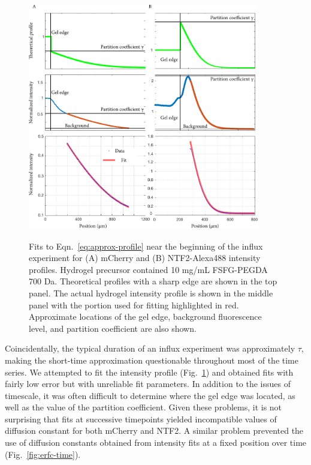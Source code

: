 \begin{figure}[t!]
\caption[Fits to concentration profiles at a fixed time.]{Fits to Eqn.~\ref{eq:approx-profile} near the beginning of the influx experiment for (A) mCherry and (B) NTF2-Alexa488 intensity profiles.  Hydrogel precursor contained 10 mg/mL FSFG-PEGDA 700 Da.  Theoretical profiles with a sharp edge are shown in the top panel.  The actual hydrogel intensity profile is shown in the middle panel with the portion used for fitting highlighted in red.  Approximate locations of the gel edge, background fluorescence level, and partition coefficient are also shown.}
\centering
\includegraphics[width=0.9\textwidth]{figs/ch04/mCherry-erfc-position.pdf}
\label{fig:erfc-position}
\end{figure} 

Coincidentally, the typical duration of an influx experiment was approximately $\tau$, making the short-time approximation questionable throughout most of the time series.  We attempted to fit the intensity profile (Fig.~\ref{fig:erfc-position}) and obtained fits with fairly low error but with unreliable fit parameters.  In addition to the issues of timescale, it was often difficult to determine where the gel edge was located, as well as the value of the partition coefficient.  Given these problems, it is not surprising that fits at successive timepoints yielded incompatible values of diffusion constant for both mCherry and NTF2.  A similar problem prevented the use of diffusion constants obtained from intensity fits at a fixed position over time (Fig.~\ref{fig:erfc-time}).

